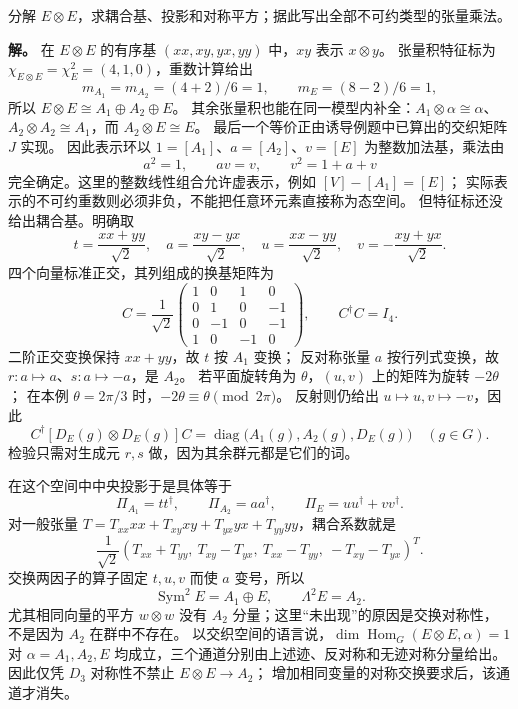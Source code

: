 \begin{workedexample}
\label{ex:d3-comprehensive-cg}
分解 $E\otimes E$，求耦合基、投影和对称平方；据此写出全部不可约类型的张量乘法。

\textbf{解。} 在 $E\otimes E$ 的有序基 $(xx,xy,yx,yy)$ 中，$xy$ 表示 $x\otimes y$。
张量积特征标为 $\chi_{E\otimes E}=\chi_E^2=(4,1,0)$，重数计算给出
\[
m_{A_1}=m_{A_2}=(4+2)/6=1,\qquad m_E=(8-2)/6=1,
\]
所以 $E\otimes E\cong A_1\oplus A_2\oplus E$。
其余张量积也能在同一模型内补全：$A_1\otimes\alpha\cong\alpha$、
$A_2\otimes A_2\cong A_1$，而 $A_2\otimes E\cong E$。
最后一个等价正由诱导例题中已算出的交织矩阵 $J$ 实现。
因此表示环以 $1=[A_1]$、$a=[A_2]$、$v=[E]$ 为整数加法基，乘法由
\[
a^2=1,\qquad av=v,\qquad v^2=1+a+v
\]
完全确定。这里的整数线性组合允许虚表示，例如 $[V]-[A_1]=[E]$；
实际表示的不可约重数则必须非负，不能把任意环元素直接称为态空间。
但特征标还没给出耦合基。明确取
\[
t=\frac{xx+yy}{\sqrt2},\quad
a=\frac{xy-yx}{\sqrt2},\quad
u=\frac{xx-yy}{\sqrt2},\quad
v=-\frac{xy+yx}{\sqrt2}.
\]
四个向量标准正交，其列组成的换基矩阵为
\[
C=\frac1{\sqrt2}
\begin{pmatrix}
1&0&1&0\\0&1&0&-1\\0&-1&0&-1\\1&0&-1&0
\end{pmatrix},\qquad C^\dagger C=I_4.
\]
二阶正交变换保持 $xx+yy$，故 $t$ 按 $A_1$ 变换；
反对称张量 $a$ 按行列式变换，故 $r:a\mapsto a$、$s:a\mapsto-a$，是 $A_2$。
若平面旋转角为 $\theta$，$(u,v)$ 上的矩阵为旋转 $-2\theta$；
在本例 $\theta=2\pi/3$ 时，$-2\theta\equiv\theta\pmod{2\pi}$。
反射则仍给出 $u\mapsto u,v\mapsto-v$，因此
\[
C^\dagger[D_E(g)\otimes D_E(g)]C
=\operatorname{diag}\bigl(A_1(g),A_2(g),D_E(g)\bigr)
\quad(g\in G).
\]
检验只需对生成元 $r,s$ 做，因为其余群元都是它们的词。

在这个空间中中央投影于是具体等于
\[
\Pi_{A_1}=tt^\dagger,\qquad
\Pi_{A_2}=aa^\dagger,\qquad
\Pi_E=uu^\dagger+vv^\dagger.
\]
对一般张量 $T=T_{xx}xx+T_{xy}xy+T_{yx}yx+T_{yy}yy$，耦合系数就是
\[
\frac1{\sqrt2}(T_{xx}+T_{yy},\ T_{xy}-T_{yx},\ T_{xx}-T_{yy},\ -T_{xy}-T_{yx})^T.
\]
交换两因子的算子固定 $t,u,v$ 而使 $a$ 变号，所以
\[
\operatorname{Sym}^2 E=A_1\oplus E,\qquad\Lambda^2E=A_2.
\]
尤其相同向量的平方 $w\otimes w$ 没有 $A_2$ 分量；这里“未出现”的原因是交换对称性，
不是因为 $A_2$ 在群中不存在。
以交织空间的语言说，$\dim\operatorname{Hom}_G(E\otimes E,\alpha)=1$
对 $\alpha=A_1,A_2,E$ 均成立，三个通道分别由上述迹、反对称和无迹对称分量给出。
因此仅凭 $D_3$ 对称性不禁止 $E\otimes E\to A_2$；
增加相同变量的对称交换要求后，该通道才消失。
\end{workedexample}

